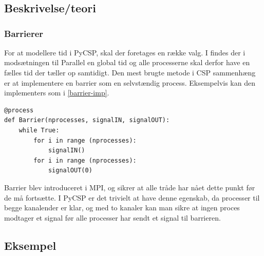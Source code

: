 \chapter{\des}
  \section{Beskrivelse/teori}
    
\subsection{Barrierer}\label{barrier}
For at modellere tid i PyCSP, skal der foretages en 
række valg. I \des findes der i modsætningen til 
Parallel \des {} en global tid og alle processerne skal derfor have  en 
fælles tid der tæller op samtidigt. Den mest brugte metode i CSP sammenhæng er 
at implementere en barrier som en selvstændig process. Eksempelvis kan den implementers som i \autoref{barrier-imp}.

\begin{lstlisting}[float, label=barrier-imp,caption=En barrier i PyCSP]
@process
def Barrier(nprocesses, signalIN, signalOUT):
	while True:
		for i in range (nprocesses):
			signalIN()
		for i in range (nprocesses):
			signalOUT(0)
\end{lstlisting}

Barrier blev introduceret i MPI, og sikrer at alle tråde har nået dette punkt 
før de må fortsætte. I PyCSP er det trivielt at have  denne egenskab, da 
processer til begge kanalender er klar, og med to kanaler kan man sikre at 
ingen proces modtager et signal før alle processer har sendt et signal til 
barrieren.

\section{Eksempel}


